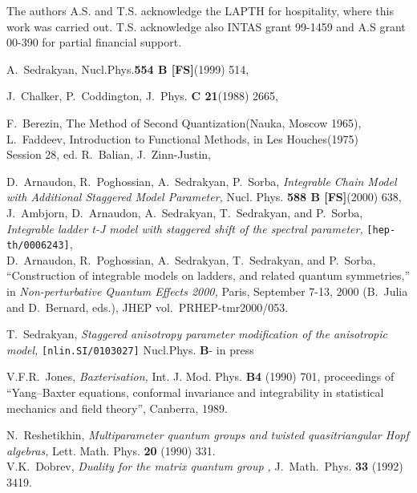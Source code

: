 \documentclass[a4paper,a4paper]{article}
\def\CC{{\mathbb C}}
\begin{document}
\indent

The authors A.S. and T.S. acknowledge the LAPTH for hospitality,
where this work was carried out. T.S. acknowledge also INTAS
grant 99-1459 and A.S grant 00-390 for partial financial support.
  
\begin{thebibliography}{10}

 A.~Sedrakyan, Nucl.Phys.{\bf 554 B [FS]}(1999) 514,

 J.~Chalker, P.~Coddington, J.~Phys. {\bf C 21}(1988) 2665,

 F.~Berezin,  The Method of Second Quantization(Nauka,
  Moscow 1965), \\
  L.~Faddeev, Introduction to Functional Methods, in Les Houches(1975)\\
  Session 28, ed. R.~Balian, J.~Zinn-Justin,

  D.~Arnaudon, R.~Poghossian, A.~Sedrakyan, P.~Sorba,  
  \textsl{Integrable Chain Model with Additional Staggered Model
  Parameter,} Nucl. Phys. {\bf 588 B [FS]}(2000) 638, 
\\
  J.~Ambjorn, D.~Arnaudon, A.~Sedrakyan, T.~Sedrakyan, and P.~Sorba,
  \textsl{Integrable 
  ladder t-{J} model with staggered shift of the spectral parameter,}
  \texttt{[hep-th/0006243]},
\\
  D.~Arnaudon, R.~Poghossian, A.~Sedrakyan, T.~Sedrakyan, and
  P.~Sorba, ``Construction of integrable models on ladders, and
  related quantum  symmetries,'' in {\em Non-perturbative Quantum
  Effects 2000,} Paris, September 7-13,  2000 (B.~Julia and
  D.~Bernard, eds.),  JHEP vol.~PRHEP-tmr2000/053. 

 T.~Sedrakyan, \textsl{Staggered anisotropy parameter
modification of the anisotropic \coordHE{} model,} \texttt{[nlin.SI/0103027]}
Nucl.Phys. {\bf B}- in press

  V.F.R.~Jones, \textsl{Baxterisation,} Int.  J. Mod.  Phys.  \textbf{B4}
  (1990) 701, proceedings of ``Yang--Baxter equations, conformal invariance
  and integrability in statistical mechanics and field theory'', Canberra,
  1989.
 
 N.~Reshetikhin,   
  \textsl{Multiparameter quantum groups and twisted quasitriangular 
    {H}opf algebras,}
  Lett. Math. Phys. \textbf{20} (1990) 331.
  \\
  V.K.~Dobrev,   \textsl{Duality for the matrix quantum group
  \myHighlight{$GL_{p,q}(2,\CC)$}\coordHE{},} 
  J.~Math.~Phys. \textbf{33} (1992) 3419.


\end{thebibliography}
\end{document}
